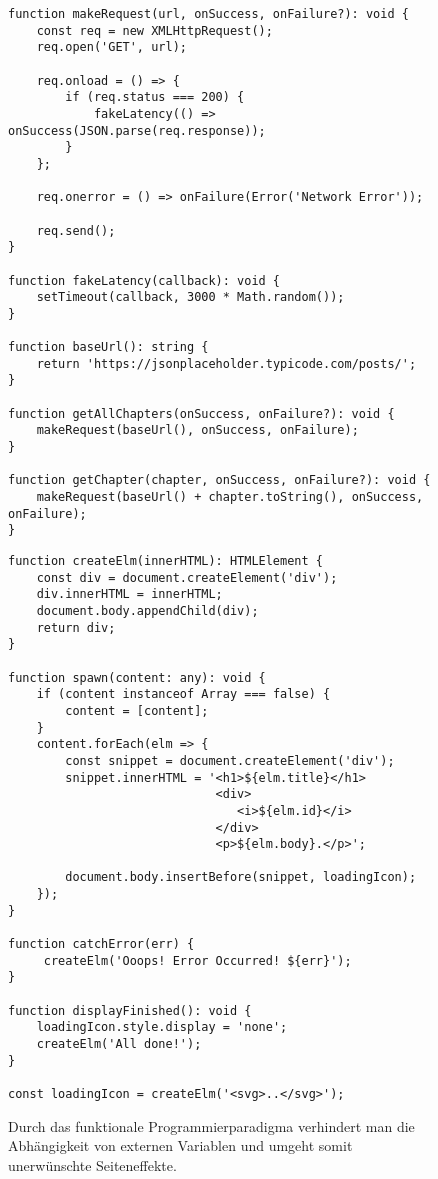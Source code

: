 \begin{figure}[H]
\begin{lstlisting}[basicstyle=\small]
function makeRequest(url, onSuccess, onFailure?): void {
    const req = new XMLHttpRequest();
    req.open('GET', url);

    req.onload = () => {
        if (req.status === 200) {
            fakeLatency(() => onSuccess(JSON.parse(req.response));
        }
    };

    req.onerror = () => onFailure(Error('Network Error'));

    req.send();
}

function fakeLatency(callback): void {
    setTimeout(callback, 3000 * Math.random());
}

function baseUrl(): string {
    return 'https://jsonplaceholder.typicode.com/posts/';
}

function getAllChapters(onSuccess, onFailure?): void {
    makeRequest(baseUrl(), onSuccess, onFailure);
}

function getChapter(chapter, onSuccess, onFailure?): void {
    makeRequest(baseUrl() + chapter.toString(), onSuccess, onFailure);
}
\end{lstlisting}
\end{figure}

\begin{figure}[H]
\begin{lstlisting}[basicstyle=\small]
function createElm(innerHTML): HTMLElement {
    const div = document.createElement('div');
    div.innerHTML = innerHTML;
    document.body.appendChild(div);
    return div;
}

function spawn(content: any): void {
    if (content instanceof Array === false) {
        content = [content];
    }
    content.forEach(elm => {
        const snippet = document.createElement('div');
        snippet.innerHTML = '<h1>${elm.title}</h1>
                             <div>
                                <i>${elm.id}</i>
                             </div>
                             <p>${elm.body}.</p>';

        document.body.insertBefore(snippet, loadingIcon);
    });
}

function catchError(err) {
     createElm('Ooops! Error Occurred! ${err}');
}

function displayFinished(): void {
    loadingIcon.style.display = 'none';
    createElm('All done!');
}

const loadingIcon = createElm('<svg>..</svg>');
\end{lstlisting}
\caption{Durch das funktionale Programmierparadigma verhindert man die Abhängigkeit von externen Variablen und umgeht somit unerwünschte Seiteneffekte.}
\end{figure}


